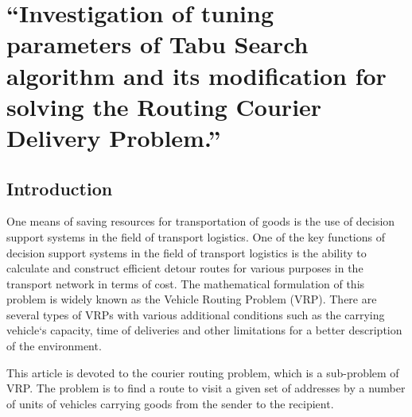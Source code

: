 \documentclass[]{TAACpaper}
\begin{document}

\def\dd#1#2{\frac{\partial#1}{\partial#2}}
\section{
``Investigation of tuning parameters of Tabu Search algorithm and its modification  for solving the Routing Courier Delivery Problem.'' 
}



\subsection{Introduction}
One means of saving resources for transportation of goods is the use of decision support systems in the field of transport logistics. One of the key functions of decision support systems in the field of transport logistics is the ability to calculate and construct efficient detour routes for various purposes in the transport network in terms of cost. The mathematical formulation of this problem is widely known as the Vehicle Routing Problem (VRP). There are several types of VRPs with various additional conditions such as the carrying vehicle`s capacity, time of deliveries and other limitations for a better description of the environment.

This article is devoted to the courier routing problem, which is a sub-problem of VRP. The problem is to find a route to visit a given set of addresses by a number of units of vehicles carrying goods from the sender to the recipient.
\end{document}
